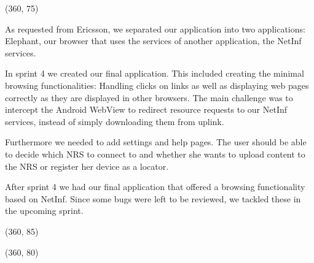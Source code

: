 \framebox(360, 75){
}

As requested from Ericsson, we separated our application into two
applications: Elephant, our browser that uses the services of another application,
the NetInf services. 

In sprint 4 we created our final application. This included
creating the minimal browsing functionalities: Handling clicks on links
as well as displaying web pages correctly as they are displayed in
other browsers. The main challenge was to intercept the Android WebView
to redirect resource requests to our NetInf services, instead of simply
downloading them from uplink.

Furthermore we needed to add settings and help pages. The user should
be able to decide which NRS to connect to and whether she wants to upload content to the NRS or
register her device as a locator.

After sprint 4 we had our final application that offered a browsing functionality
based on NetInf. Since some bugs were left to be reviewed, we tackled these
in the upcoming sprint.


\framebox(360, 85){
}

\framebox(360, 80){
}

